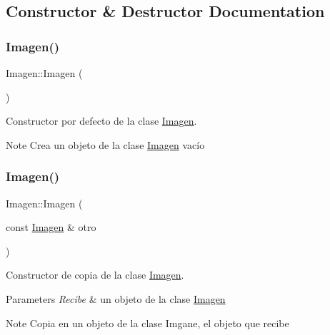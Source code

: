 \subsection{Constructor \& Destructor Documentation}
\mbox{\label{classImagen_ab2e649aa7a105155c7bfdb846abf0528}} 
\subsubsection{\texorpdfstring{Imagen()}{Imagen()}\hspace{0.1cm}{\footnotesize\ttfamily [1/3]}}
{\footnotesize\ttfamily Imagen\+::\+Imagen (\begin{DoxyParamCaption}{ }\end{DoxyParamCaption})}



Constructor por defecto de la clase \hyperlink{classImagen}{Imagen}. 

\begin{DoxyNote}{Note}
Crea un objeto de la clase \hyperlink{classImagen}{Imagen} vacío 
\end{DoxyNote}
\mbox{\label{classImagen_a46f9fbbfd928f81c2f37947cde05d73c}} 
\subsubsection{\texorpdfstring{Imagen()}{Imagen()}\hspace{0.1cm}{\footnotesize\ttfamily [2/3]}}
{\footnotesize\ttfamily Imagen\+::\+Imagen (\begin{DoxyParamCaption}\item[{const \hyperlink{classImagen}{Imagen} \&}]{otro }\end{DoxyParamCaption})}



Constructor de copia de la clase \hyperlink{classImagen}{Imagen}. 


\begin{DoxyParams}{Parameters}
{\em Recibe} & un objeto de la clase \hyperlink{classImagen}{Imagen} \\
\hline
\end{DoxyParams}
\begin{DoxyNote}{Note}
Copia en un objeto de la clase Imgane, el objeto que recibe 
\end{DoxyNote}
\mbox{\label{classImagen_ad4943ff0e2de31d4c25a879030f3ebf2}} 
